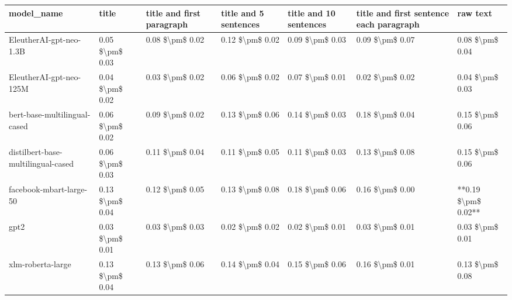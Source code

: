 \begin{tabular}{lllllll}
\toprule
                        model\_name &           title & title and first paragraph & title and 5 sentences & title and 10 sentences & title and first sentence each paragraph &            raw text \\
\midrule
           EleutherAI-gpt-neo-1.3B & 0.05 \$\textbackslash pm\$ 0.03 &           0.08 \$\textbackslash pm\$ 0.02 &       0.12 \$\textbackslash pm\$ 0.02 &        0.09 \$\textbackslash pm\$ 0.03 &                         0.09 \$\textbackslash pm\$ 0.07 &     0.08 \$\textbackslash pm\$ 0.04 \\
           EleutherAI-gpt-neo-125M & 0.04 \$\textbackslash pm\$ 0.02 &           0.03 \$\textbackslash pm\$ 0.02 &       0.06 \$\textbackslash pm\$ 0.02 &        0.07 \$\textbackslash pm\$ 0.01 &                         0.02 \$\textbackslash pm\$ 0.02 &     0.04 \$\textbackslash pm\$ 0.03 \\
      bert-base-multilingual-cased & 0.06 \$\textbackslash pm\$ 0.02 &           0.09 \$\textbackslash pm\$ 0.02 &       0.13 \$\textbackslash pm\$ 0.06 &        0.14 \$\textbackslash pm\$ 0.03 &                         0.18 \$\textbackslash pm\$ 0.04 &     0.15 \$\textbackslash pm\$ 0.06 \\
distilbert-base-multilingual-cased & 0.06 \$\textbackslash pm\$ 0.03 &           0.11 \$\textbackslash pm\$ 0.04 &       0.11 \$\textbackslash pm\$ 0.05 &        0.11 \$\textbackslash pm\$ 0.03 &                         0.13 \$\textbackslash pm\$ 0.08 &     0.15 \$\textbackslash pm\$ 0.06 \\
           facebook-mbart-large-50 & 0.13 \$\textbackslash pm\$ 0.04 &           0.12 \$\textbackslash pm\$ 0.05 &       0.13 \$\textbackslash pm\$ 0.08 &        0.18 \$\textbackslash pm\$ 0.06 &                         0.16 \$\textbackslash pm\$ 0.00 & **0.19 \$\textbackslash pm\$ 0.02** \\
                              gpt2 & 0.03 \$\textbackslash pm\$ 0.01 &           0.03 \$\textbackslash pm\$ 0.03 &       0.02 \$\textbackslash pm\$ 0.02 &        0.02 \$\textbackslash pm\$ 0.01 &                         0.03 \$\textbackslash pm\$ 0.01 &     0.03 \$\textbackslash pm\$ 0.01 \\
                 xlm-roberta-large & 0.13 \$\textbackslash pm\$ 0.04 &           0.13 \$\textbackslash pm\$ 0.06 &       0.14 \$\textbackslash pm\$ 0.04 &        0.15 \$\textbackslash pm\$ 0.06 &                         0.16 \$\textbackslash pm\$ 0.01 &     0.13 \$\textbackslash pm\$ 0.08 \\
\bottomrule
\end{tabular}
